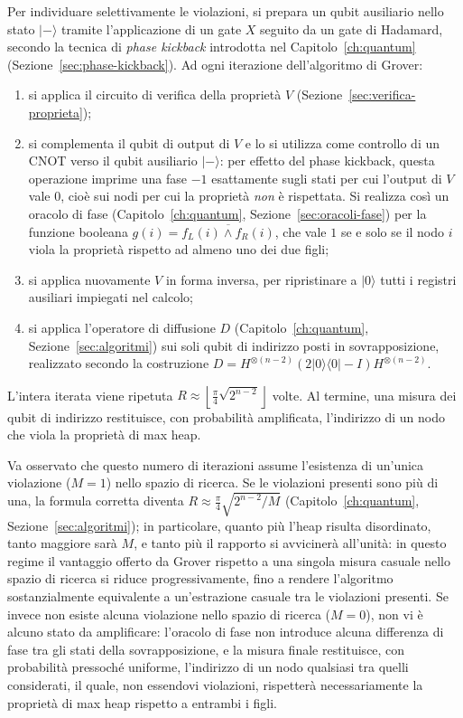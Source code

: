 Per individuare selettivamente le violazioni, si prepara un qubit ausiliario nello stato $|-\rangle$ tramite l'applicazione di un gate $X$ seguito da un gate di Hadamard, secondo la tecnica di \emph{phase kickback} introdotta nel Capitolo~\ref{ch:quantum} (Sezione~\ref{sec:phase-kickback}). Ad ogni iterazione dell'algoritmo di Grover:
\begin{enumerate}
  \item si applica il circuito di verifica della proprietà $V$ (Sezione~\ref{sec:verifica-proprieta});
  \item si complementa il qubit di output di $V$ e lo si utilizza come controllo di un CNOT verso il qubit ausiliario $|-\rangle$: per effetto del phase kickback, questa operazione imprime una fase $-1$ esattamente sugli stati per cui l'output di $V$ vale $0$, cioè sui nodi per cui la proprietà \emph{non} è rispettata. Si realizza così un oracolo di fase (Capitolo~\ref{ch:quantum}, Sezione~\ref{sec:oracoli-fase}) per la funzione booleana $g(i) = \overline{f_L(i) \wedge f_R(i)}$, che vale $1$ se e solo se il nodo $i$ viola la proprietà rispetto ad almeno uno dei due figli;
  \item si applica nuovamente $V$ in forma inversa, per ripristinare a $|0\rangle$ tutti i registri ausiliari impiegati nel calcolo;
  \item si applica l'operatore di diffusione $D$ (Capitolo~\ref{ch:quantum}, Sezione~\ref{sec:algoritmi}) sui soli qubit di indirizzo posti in sovrapposizione, realizzato secondo la costruzione $D = H^{\otimes(n-2)}(2|0\rangle\langle 0|-I)H^{\otimes(n-2)}$.
\end{enumerate}
L'intera iterata viene ripetuta $R \approx \left\lfloor \frac{\pi}{4}\sqrt{2^{n-2}} \right\rfloor$ volte. Al termine, una misura dei qubit di indirizzo restituisce, con probabilità amplificata, l'indirizzo di un nodo che viola la proprietà di max heap.

Va osservato che questo numero di iterazioni assume l'esistenza di un'unica violazione ($M=1$) nello spazio di ricerca. Se le violazioni presenti sono più di una, la formula corretta diventa $R\approx\frac{\pi}{4}\sqrt{2^{n-2}/M}$ (Capitolo~\ref{ch:quantum}, Sezione~\ref{sec:algoritmi}); in particolare, quanto più l'heap risulta disordinato, tanto maggiore sarà $M$, e tanto più il rapporto si avvicinerà all'unità: in questo regime il vantaggio offerto da Grover rispetto a una singola misura casuale nello spazio di ricerca si riduce progressivamente, fino a rendere l'algoritmo sostanzialmente equivalente a un'estrazione casuale tra le violazioni presenti. Se invece non esiste alcuna violazione nello spazio di ricerca ($M=0$), non vi è alcuno stato da amplificare: l'oracolo di fase non introduce alcuna differenza di fase tra gli stati della sovrapposizione, e la misura finale restituisce, con probabilità pressoché uniforme, l'indirizzo di un nodo qualsiasi tra quelli considerati, il quale, non essendovi violazioni, rispetterà necessariamente la proprietà di max heap rispetto a entrambi i figli.

